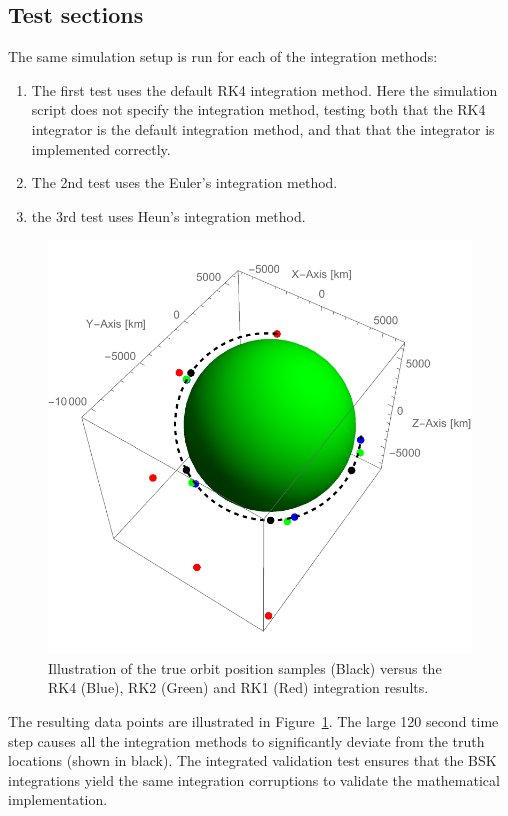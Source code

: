 \subsection{Test sections}
The same simulation setup is run for each of the integration methods:
\begin{enumerate}
\item The first test uses the default RK4 integration method.  Here the simulation script does not specify the integration method, testing both that the RK4 integrator is the default integration method, and that that the integrator is implemented correctly.

\item The 2nd test uses the Euler's integration method.

\item the 3rd test uses Heun's integration method.

\end{enumerate}

\begin{figure}[t]
	\centerline{
	\includegraphics[]{Figures/intResults}
	}
	\caption{Illustration of the true orbit position samples (Black) versus the RK4 (Blue), RK2 (Green) and RK1 (Red) integration results.}
	\label{fig:intResults}
\end{figure}
The resulting data points are illustrated in Figure~\ref{fig:intResults}.  The large 120 second time step causes all the integration methods to significantly deviate from the truth locations (shown in black).  The integrated validation test ensures that the BSK integrations yield the same integration corruptions to validate the mathematical implementation.

